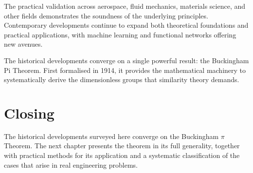 The practical validation across aerospace, fluid mechanics, materials science, and other fields demonstrates the soundness of the underlying principles. Contemporary developments continue to expand both theoretical foundations and practical applications, with machine learning and functional networks offering new avenues.

The historical developments converge on a single powerful result: the Buckingham Pi Theorem. First formalised in 1914, it provides the mathematical machinery to systematically derive the dimensionless groups that similarity theory demands.

\section*{Closing}
The historical developments surveyed here converge on the Buckingham \(\pi\) Theorem. The next chapter presents the theorem in its full generality, together with practical methods for its application and a systematic classification of the cases that arise in real engineering problems. 